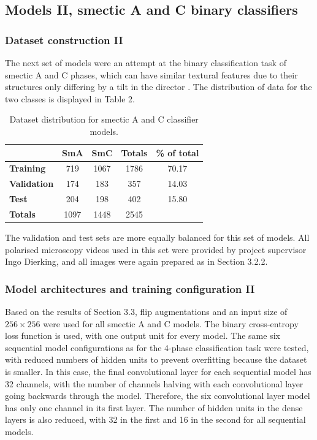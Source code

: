 \documentclass[12pt]{article}
\begin{document}
\subsection{Models II, smectic A and C binary classifiers}
\subsubsection{Dataset construction II}
The next set of models were an attempt at the binary classification task of smectic A and C phases, which can have similar textural features due to their structures only differing by a tilt in the director \cite{Dierking03}. The distribution of data for the two classes is displayed in Table 2.
\begin{table}[!htb]
\begin{center}
\caption{Dataset distribution for smectic A and C classifier models.}
\begin{tabular}{l|c|c|c|c}
\toprule
& \textbf{SmA} & \textbf{SmC} & \textbf{Totals} & \textbf{\% of total}\\
\midrule
\textbf{Training} & 719 & 1067 & 1786 & 70.17\\
\textbf{Validation} & 174 & 183 & 357 & 14.03\\
\textbf{Test} & 204 & 198 & 402 & 15.80\\
\midrule
\textbf{Totals} & 1097 & 1448 & 2545\\
\bottomrule
\end{tabular}
\end{center}
\end{table}
The validation and test sets are more equally balanced for this set of models. All polarised microscopy videos used in this set were provided by project supervisor Ingo Dierking, and all images were again prepared as in Section 3.2.2.
\subsubsection{Model architectures and training configuration II}
Based on the results of Section 3.3, flip augmentations and an input size of $256 \times 256$ were used for all smectic A and C models. The binary cross-entropy loss function is used, with one output unit for every model. The same six sequential model configurations as for the 4-phase classification task were tested, with reduced numbers of hidden units to prevent overfitting because the dataset is smaller. In this case, the final convolutional layer for each sequential model has 32 channels, with the number of channels halving with each convolutional layer going backwards through the model. Therefore, the six convolutional layer model has only one channel in its first layer. The number of hidden units in the dense layers is also reduced, with 32 in the first and 16 in the second for all sequential models.
\end{document}
